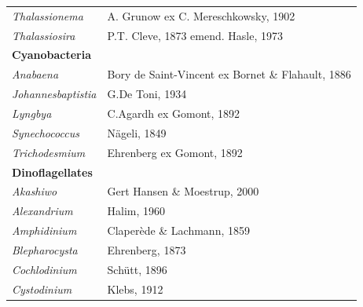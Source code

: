 \documentclass[draft]{agujournal2019}
\begin{document}
\begin{table}
\begin{tabular}{@{}ll@{}}
\textit{Thalassionema}     & A. Grunow ex C. Mereschkowsky, 1902                        \\
\textit{Thalassiosira}     & P.T. Cleve, 1873 emend. Hasle, 1973                        \\
\textbf{Cyanobacteria}     &                                                            \\
\textit{Anabaena}          & Bory de Saint-Vincent ex Bornet \& Flahault, 1886          \\
\textit{Johannesbaptistia} & G.De Toni, 1934                                            \\
\textit{Lyngbya}           & C.Agardh ex Gomont, 1892                                   \\
\textit{Synechococcus}     & Nägeli, 1849                                               \\
\textit{Trichodesmium}     & Ehrenberg ex Gomont, 1892                                  \\
\textbf{Dinoflagellates}    &                                                            \\
\textit{Akashiwo}          & Gert Hansen \& Moestrup, 2000                              \\
\textit{Alexandrium}       & Halim, 1960                                                \\
\textit{Amphidinium}       & Claperède \& Lachmann, 1859                                \\
\textit{Blepharocysta}     & Ehrenberg, 1873                                            \\
\textit{Cochlodinium}      & Schütt, 1896                                               \\
\textit{Cystodinium}       & Klebs, 1912                                                \\

\end{tabular}

\label{tab:sup:GenusFuncGroups}
\end{table}
\end{document}
